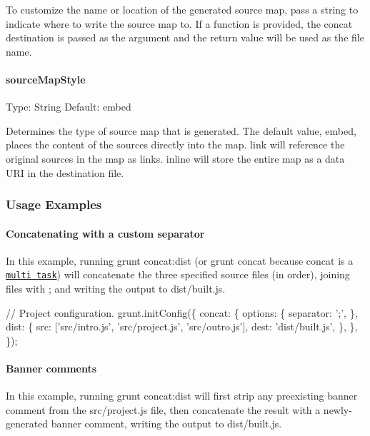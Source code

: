 To customize the name or location of the generated source map, pass a string to indicate where to write the source map to. If a function is provided, the concat destination is passed as the argument and the return value will be used as the file name.

\paragraph*{source\+Map\+Style}

Type\+: {\ttfamily String} Default\+: {\ttfamily embed}

Determines the type of source map that is generated. The default value, {\ttfamily embed}, places the content of the sources directly into the map. {\ttfamily link} will reference the original sources in the map as links. {\ttfamily inline} will store the entire map as a data U\+RI in the destination file.

\subsubsection*{Usage Examples}

\paragraph*{Concatenating with a custom separator}

In this example, running {\ttfamily grunt concat\+:dist} (or {\ttfamily grunt concat} because {\ttfamily concat} is a \href{http://gruntjs.com/creating-tasks#multi-tasks}{\tt multi task}) will concatenate the three specified source files (in order), joining files with {\ttfamily ;} and writing the output to {\ttfamily dist/built.\+js}.


\begin{DoxyCode}
// Project configuration.
grunt.initConfig(\{
  concat: \{
    options: \{
      separator: ';',
    \},
    dist: \{
      src: ['src/intro.js', 'src/project.js', 'src/outro.js'],
      dest: 'dist/built.js',
    \},
  \},
\});
\end{DoxyCode}


\paragraph*{Banner comments}

In this example, running {\ttfamily grunt concat\+:dist} will first strip any preexisting banner comment from the {\ttfamily src/project.\+js} file, then concatenate the result with a newly-\/generated banner comment, writing the output to {\ttfamily dist/built.\+js}.

